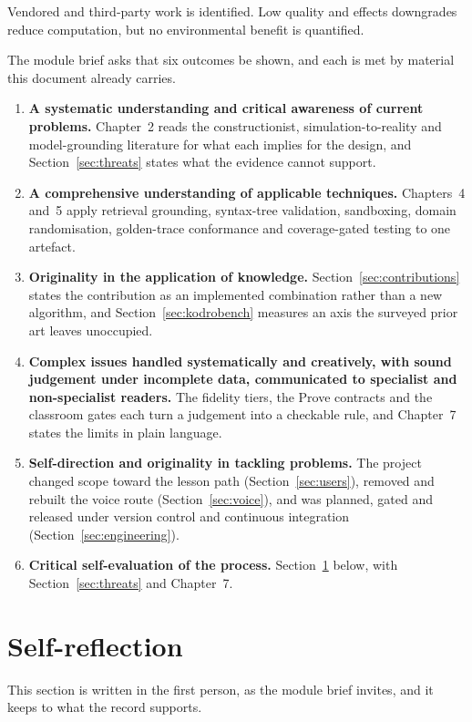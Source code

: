 \documentclass[11pt,a4paper]{report}
\begin{document}
Vendored and third-party work is identified. Low quality and effects downgrades reduce computation, but no environmental benefit is quantified.

The module brief asks that six outcomes be shown, and each is met by material this document already carries.
\begin{enumerate}[label=(\arabic*),leftmargin=*,itemsep=1pt]
\item \textbf{A systematic understanding and critical awareness of current problems.} Chapter~2 reads the constructionist, simulation-to-reality and model-grounding literature for what each implies for the design, and Section~\ref{sec:threats} states what the evidence cannot support.
\item \textbf{A comprehensive understanding of applicable techniques.} Chapters~4 and~5 apply retrieval grounding, syntax-tree validation, sandboxing, domain randomisation, golden-trace conformance and coverage-gated testing to one artefact.
\item \textbf{Originality in the application of knowledge.} Section~\ref{sec:contributions} states the contribution as an implemented combination rather than a new algorithm, and Section~\ref{sec:kodrobench} measures an axis the surveyed prior art leaves unoccupied.
\item \textbf{Complex issues handled systematically and creatively, with sound judgement under incomplete data, communicated to specialist and non-specialist readers.} The fidelity tiers, the Prove contracts and the classroom gates each turn a judgement into a checkable rule, and Chapter~7 states the limits in plain language.
\item \textbf{Self-direction and originality in tackling problems.} The project changed scope toward the lesson path (Section~\ref{sec:users}), removed and rebuilt the voice route (Section~\ref{sec:voice}), and was planned, gated and released under version control and continuous integration (Section~\ref{sec:engineering}).
\item \textbf{Critical self-evaluation of the process.} Section~\ref{sec:reflection} below, with Section~\ref{sec:threats} and Chapter~7.
\end{enumerate}

\section{Self-reflection}
\label{sec:reflection}
This section is written in the first person, as the module brief invites, and it keeps to what the record supports.
\end{document}
